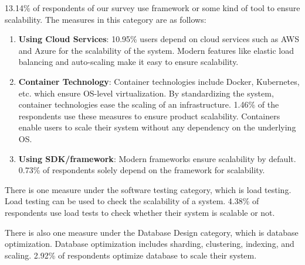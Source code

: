  13.14\% of respondents of our survey use framework or some kind of tool to ensure scalability. The measures in this category are as follows:
\begin{enumerate}[label=(\alph*)]

    \item \textbf{Using Cloud Services}: 10.95\% users depend on cloud services such as AWS and Azure for the scalability of the system. Modern features like elastic load balancing and auto-scaling make it easy to ensure scalability.
    
    \item \textbf{Container Technology}: Container technologies include Docker, Kubernetes, etc. which ensure OS-level virtualization. By standardizing the system, container technologies ease the scaling of an infrastructure. 1.46\% of the respondents use these measures to ensure product scalability. Containers enable users to scale their system without any dependency on the underlying OS.
    
    \item \textbf{Using SDK/framework}: Modern frameworks ensure scalability by default. 0.73\% of respondents solely depend on the framework for scalability.
  
\end{enumerate}
 
 
There is one measure under the software testing category, which is load testing. Load testing can be used to check the scalability of a system. 4.38\% of respondents use load tests to check whether their system is scalable or not.

There is also one measure under the Database Design category, which is database optimization. Database optimization includes sharding, clustering, indexing, and scaling. 2.92\% of respondents optimize database to scale their system.
